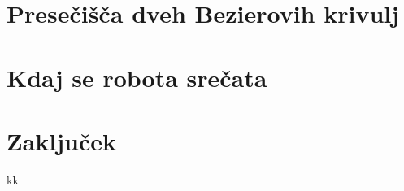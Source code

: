 \documentclass[a4paper, 12pt]{article} %
\begin{document}
\section{Presečišča dveh Bezierovih krivulj}

\section{Kdaj se robota srečata}

\section{Zaključek}

\begin{thebibliography}{9}
 kk
\end{thebibliography}
\end{document}
